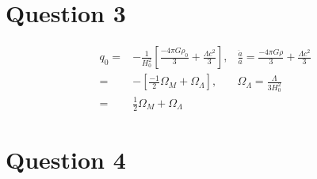 \documentclass[10pt,a4paper]{article}
\begin{document}
\section*{Question 3}
\begin{eqnarray*}
	q_{0} =& -\frac{1}{H_{0}^{2}}[\frac{-4\pi G \rho_{0}}{3} + \frac{\Lambda c^{2}}{3}], &\frac{\ddot a}{a} = \frac{-4\pi G \rho}{3} + \frac{\Lambda c^{2}}{3} \\
	=& -[\frac{-1}{2}\Omega_{M} + \Omega_{\Lambda}], &\Omega_{\Lambda} = \frac{\Lambda}{3H_{0}^{2}} \\
	=& \frac{1}{2}\Omega_{M} + \Omega_{\Lambda} &
\end{eqnarray*}
\section*{Question 4}
\end{document}
